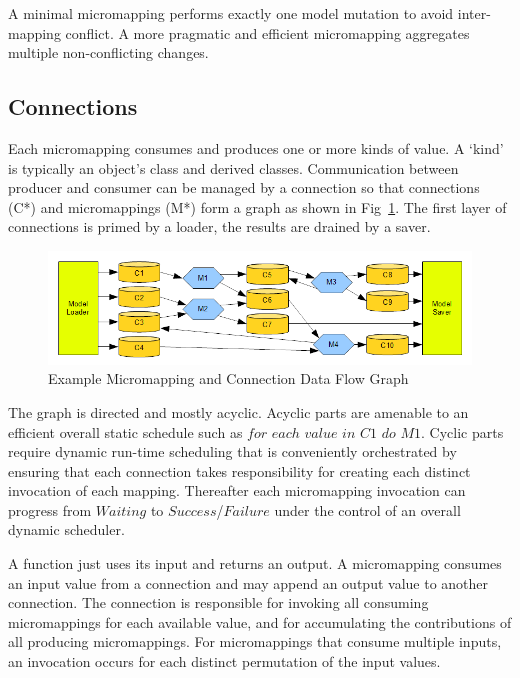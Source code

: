 \documentclass{llncs}
\begin{document}
A minimal micromapping performs exactly one model mutation to avoid inter-mapping conflict. A more pragmatic and efficient micromapping aggregates multiple non-conflicting changes.

\subsection{Connections}

Each micromapping consumes and produces one or more kinds of value. A `kind' is typically an object's class and derived classes.
Communication between producer and consumer can be managed by a connection so that connections (C*) and micromappings (M*)  form a graph as shown in Fig~\ref{fig:ExecutionContext}. The first layer of connections is primed by a loader, the results are drained by a saver.

\begin{figure}
  \begin{center}
    \includegraphics[width=4.75in]{ExecutionContext.png}
  \end{center}
  \caption{Example Micromapping and Connection Data Flow Graph}
  \label{fig:ExecutionContext}
\end{figure}

The graph is directed and mostly acyclic. Acyclic parts are amenable to an efficient overall static schedule such as $for$ $each$ $value$ $in$ $C1$ $do$ $M1$. Cyclic parts require dynamic run-time scheduling that is conveniently orchestrated by ensuring that each connection takes responsibility for creating each distinct invocation of each mapping. Thereafter each micromapping invocation can progress from $Waiting$ to $Success$/$Failure$ under the control of an overall dynamic scheduler.

A function just uses its input and returns an output. A micromapping consumes an input value from a connection and may append an output value to another connection. The connection is responsible for invoking all consuming micromappings for each available value, and for accumulating the contributions of all producing micromappings. For micromappings that consume multiple inputs, an invocation occurs for each distinct permutation of the input values.
\end{document}
